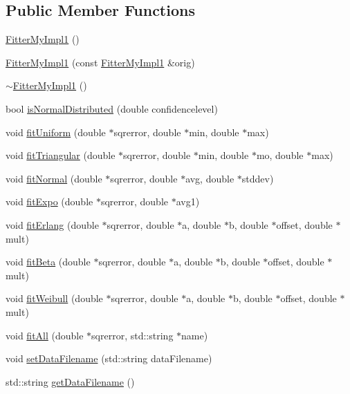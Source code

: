 \subsection*{Public Member Functions}
\begin{DoxyCompactItemize}
\item 
\hyperlink{class_fitter_my_impl1_a9047919931ab66d267e9c91a378e7413}{Fitter\-My\-Impl1} ()
\item 
\hyperlink{class_fitter_my_impl1_a240ccdcb7aef045f1a31b554b990593a}{Fitter\-My\-Impl1} (const \hyperlink{class_fitter_my_impl1}{Fitter\-My\-Impl1} \&orig)
\item 
\hyperlink{class_fitter_my_impl1_a7097d3bca5ecc73393b54ef07973b841}{$\sim$\-Fitter\-My\-Impl1} ()
\item 
bool \hyperlink{class_fitter_my_impl1_abcb39383a71603a570d1e2c396c6b7ca}{is\-Normal\-Distributed} (double confidencelevel)
\item 
void \hyperlink{class_fitter_my_impl1_adde8080641759eaea1d247d3c7436b1d}{fit\-Uniform} (double $\ast$sqrerror, double $\ast$min, double $\ast$max)
\item 
void \hyperlink{class_fitter_my_impl1_a41a9b0e578a67a5bb33bb248388f5cb4}{fit\-Triangular} (double $\ast$sqrerror, double $\ast$min, double $\ast$mo, double $\ast$max)
\item 
void \hyperlink{class_fitter_my_impl1_a42ad0944837a2921674289c2ac264176}{fit\-Normal} (double $\ast$sqrerror, double $\ast$avg, double $\ast$stddev)
\item 
void \hyperlink{class_fitter_my_impl1_aba4920314b8dcf17ee9d4f6d19ea48b2}{fit\-Expo} (double $\ast$sqrerror, double $\ast$avg1)
\item 
void \hyperlink{class_fitter_my_impl1_af5e7d08e466ae2154a97356939447f3c}{fit\-Erlang} (double $\ast$sqrerror, double $\ast$a, double $\ast$b, double $\ast$offset, double $\ast$mult)
\item 
void \hyperlink{class_fitter_my_impl1_acc9bcdffd5336751b197ed495c5826ca}{fit\-Beta} (double $\ast$sqrerror, double $\ast$a, double $\ast$b, double $\ast$offset, double $\ast$mult)
\item 
void \hyperlink{class_fitter_my_impl1_a28bc8f7f558e4328bede20c941b6c32b}{fit\-Weibull} (double $\ast$sqrerror, double $\ast$a, double $\ast$b, double $\ast$offset, double $\ast$mult)
\item 
void \hyperlink{class_fitter_my_impl1_ad10f9269396cb86f2230edf652242f23}{fit\-All} (double $\ast$sqrerror, std\-::string $\ast$name)
\item 
void \hyperlink{class_fitter_my_impl1_a02c8f65838daa1f086586561aea6e4da}{set\-Data\-Filename} (std\-::string data\-Filename)
\item 
std\-::string \hyperlink{class_fitter_my_impl1_a7a9ea5c0a702ba2880dd3ed652f92030}{get\-Data\-Filename} ()
\end{DoxyCompactItemize}


